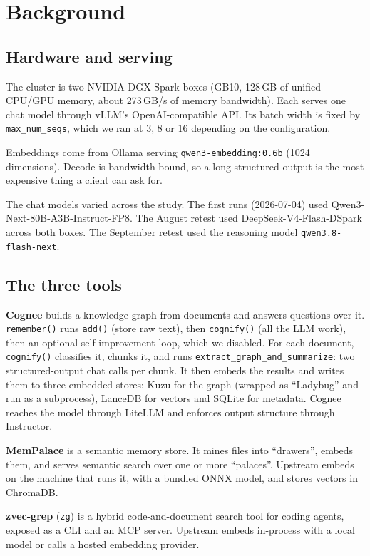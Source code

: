 \documentclass[11pt]{article}
\newcommand{\code}[1]{\texttt{#1}}
\begin{document}
\section{Background}
\label{sec:background}

\subsection{Hardware and serving}

The cluster is two NVIDIA DGX Spark boxes (GB10, 128\,GB of unified CPU/GPU memory, about
273\,GB/s of memory bandwidth). Each serves one chat model through vLLM's OpenAI-compatible API.
Its batch width is fixed by \code{max\_num\_seqs}, which we ran at 3, 8 or 16 depending on the
configuration.

Embeddings come from Ollama serving \code{qwen3-embedding:0.6b} (1024 dimensions). Decode is
bandwidth-bound, so a long structured output is the most expensive thing a client can ask for.

The chat models varied across the study. The first runs (2026-07-04) used
Qwen3-Next-80B-A3B-Instruct-FP8. The August retest used DeepSeek-V4-Flash-DSpark across both boxes.
The September retest used the reasoning model \code{qwen3.8-flash-next}.

\subsection{The three tools}

\textbf{Cognee} builds a knowledge graph from documents and answers questions over it.
\code{remember()} runs \code{add()} (store raw text), then \code{cognify()} (all the LLM work), then
an optional self-improvement loop, which we disabled. For each document, \code{cognify()} classifies
it, chunks it, and runs \code{extract\_graph\_\allowbreak and\_summarize}: two structured-output chat
calls per chunk. It then embeds the results and writes them to three embedded stores: Kuzu for the
graph (wrapped as ``Ladybug'' and run as a subprocess), LanceDB for vectors and SQLite for metadata.
Cognee reaches the model through LiteLLM and enforces output structure through Instructor.

\textbf{MemPalace} is a semantic memory store. It mines files into ``drawers'', embeds them, and
serves semantic search over one or more ``palaces''. Upstream embeds on the machine that runs it,
with a bundled ONNX model, and stores vectors in ChromaDB.

\textbf{zvec-grep} (\code{zg}) is a hybrid code-and-document search tool for coding agents, exposed
as a CLI and an MCP server. Upstream embeds in-process with a local model or calls a hosted
embedding provider.
\end{document}
